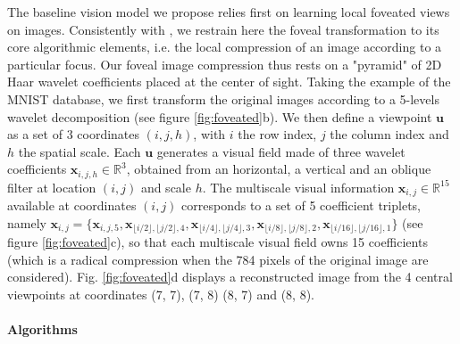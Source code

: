 \documentclass{article}
\begin{document}
The baseline vision model we propose relies first on learning local foveated views on images.
Consistently with \cite{kortum1996implementation,wang2003foveation}, we restrain here the foveal transformation to its core algorithmic elements, i.e. the local compression of an image according to a particular focus. Our foveal image compression thus rests on a "pyramid" of 2D Haar wavelet coefficients placed at the center of sight. Taking the example of the MNIST database, we first transform the original images according to a 5-levels wavelet decomposition (see figure \ref{fig:foveated}b). We then define a viewpoint $\boldsymbol{u}$ as a set of 3 coordinates $(i,j,h)$, with $i$ the row index, $j$ the column index and $h$ the spatial scale. Each $\boldsymbol{u}$ generates a visual field made of three wavelet coefficients $\boldsymbol{x}_{i,j,h} \in \mathbb{R}^3$, obtained from an horizontal, a vertical and an oblique filter at location $(i,j)$ and scale $h$.  The multiscale visual information $\boldsymbol{x}_{i,j} \in \mathbb{R}^{15}$ available at coordinates $(i,j)$ corresponds to a set of 5 coefficient triplets, namely $\boldsymbol{x}_{i,j}=\{\boldsymbol{x}_{i,j,5}, \boldsymbol{x}_{\lfloor i/2\rfloor,\lfloor j/2\rfloor,4}, \boldsymbol{x}_{\lfloor i/4\rfloor,\lfloor j/4\rfloor,3}, \boldsymbol{x}_{\lfloor i/8\rfloor,\lfloor j/8\rfloor, 2}, \boldsymbol{x}_{\lfloor i/16\rfloor,\lfloor j/16\rfloor, 1}\}$ (see figure \ref{fig:foveated}c), so that each multiscale visual field owns 15 coefficients (which is a radical compression when the 784 pixels of the original image are considered).
Fig. \ref{fig:foveated}d displays a reconstructed image from the 4 central viewpoints at coordinates (7, 7), (7, 8) (8, 7) and (8, 8).

\paragraph{Algorithms}
\end{document}

